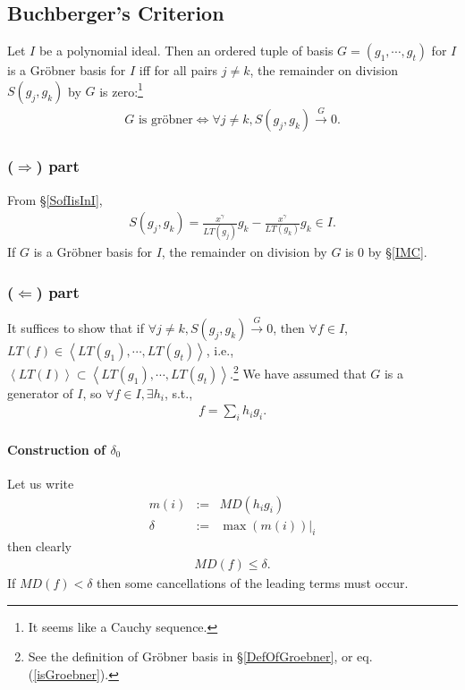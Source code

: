 \documentclass[11pt]{book}
\begin{document}
\subsection{Buchberger's Criterion}
\label{Buchberger'sCriterion}
Let $I$ be a polynomial ideal.
Then an ordered tuple of basis $G = (g_1, \cdots, g_t)$ for $I$ is a Gr\"obner basis for $I$ iff for all pairs $j \neq k$, the remainder on division $S(g_j, g_k)$ by $G$ is zero:\footnote{It seems like a Cauchy sequence.} 
\begin{eqnarray}
\text{$G$ is gr\"obner} \Leftrightarrow \forall j\neq k, S(g_j, g_k) \stackrel{G}{\to} 0.
\end{eqnarray}

\subsubsection{($\Rightarrow$) part} 
From \S\ref{SofIisInI},
\begin{eqnarray}
S(g_j, g_k) = \frac{x^\gamma}{LT(g_j)} g_k - \frac{x^\gamma}{LT(g_k)} g_k \in I.
\end{eqnarray}
If $G$ is a Gr\"obner basis for $I$, the remainder on division by $G$ is 0 by \S\ref{IMC}.

\subsubsection{($\Leftarrow$) part} 
It suffices to show that if $ \forall j\neq k, S(g_j, g_k) \stackrel{G}{\to} 0$, then $\forall f \in I$, $LT(f) \in \left< LT(g_1), \cdots, LT(g_t) \right>$, i.e., $\left< LT(I) \right> \subset \left< LT(g_1), \cdots, LT(g_t) \right>$.\footnote{See the definition of Gr\"obner basis in \S\ref{DefOfGroebner}, or eq.(\ref{isGroebner}).
}
We have assumed that $G$ is a generator of $I$, so $\forall f \in I, \exists h_i$, s.t.,
\begin{eqnarray}
f = \sum_i h_i g_i.
\end{eqnarray}

\paragraph{Construction of $\delta_0$}
Let us write
\begin{eqnarray}
m(i) &:=& MD(h_i g_i) \\
\delta &:=& \left.\max\left(m(i) \right) \right|_i
\end{eqnarray}
then clearly
\begin{eqnarray}
\label{MDfleqDelta}
MD(f) \leq \delta.
\end{eqnarray}
If $MD(f) < \delta$ then some cancellations of the leading terms must occur.
\end{document}
